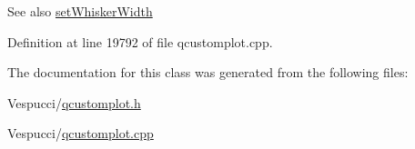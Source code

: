 \begin{DoxySeeAlso}{See also}
\hyperlink{class_q_c_p_statistical_box_adf378812446bd66f34d1f7f293d991cd}{set\+Whisker\+Width} 
\end{DoxySeeAlso}


Definition at line 19792 of file qcustomplot.\+cpp.



The documentation for this class was generated from the following files\+:\begin{DoxyCompactItemize}
\item 
Vespucci/\hyperlink{qcustomplot_8h}{qcustomplot.\+h}\item 
Vespucci/\hyperlink{qcustomplot_8cpp}{qcustomplot.\+cpp}\end{DoxyCompactItemize}
